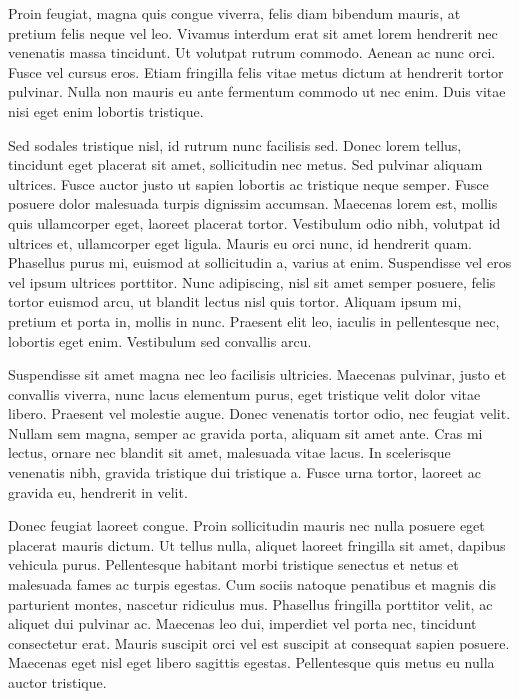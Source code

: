 \documentclass[draft=false]{book}
\begin{document}
Proin feugiat, magna quis congue viverra, felis diam bibendum mauris, at pretium felis neque vel leo. Vivamus interdum erat sit amet lorem hendrerit nec venenatis massa tincidunt. Ut volutpat rutrum commodo. Aenean ac nunc orci. Fusce vel cursus eros. Etiam fringilla felis vitae metus dictum at hendrerit tortor pulvinar. Nulla non mauris eu ante fermentum commodo ut nec enim. Duis vitae nisi eget enim lobortis tristique. 

Sed sodales tristique nisl, id rutrum nunc facilisis sed. Donec lorem tellus, tincidunt eget placerat sit amet, sollicitudin nec metus. Sed pulvinar aliquam ultrices. Fusce auctor justo ut sapien lobortis ac tristique neque semper. Fusce posuere dolor malesuada turpis dignissim accumsan. Maecenas lorem est, mollis quis ullamcorper eget, laoreet placerat tortor. Vestibulum odio nibh, volutpat id ultrices et, ullamcorper eget ligula. Mauris eu orci nunc, id hendrerit quam. Phasellus purus mi, euismod at sollicitudin a, varius at enim. Suspendisse vel eros vel ipsum ultrices porttitor. Nunc adipiscing, nisl sit amet semper posuere, felis tortor euismod arcu, ut blandit lectus nisl quis tortor. Aliquam ipsum mi, pretium et porta in, mollis in nunc. Praesent elit leo, iaculis in pellentesque nec, lobortis eget enim. Vestibulum sed convallis arcu.

Suspendisse sit amet magna nec leo facilisis ultricies. Maecenas pulvinar, justo et convallis viverra, nunc lacus elementum purus, eget tristique velit dolor vitae libero. Praesent vel molestie augue. Donec venenatis tortor odio, nec feugiat velit. Nullam sem magna, semper ac gravida porta, aliquam sit amet ante. Cras mi lectus, ornare nec blandit sit amet, malesuada vitae lacus. In scelerisque venenatis nibh, gravida tristique dui tristique a. Fusce urna tortor, laoreet ac gravida eu, hendrerit in velit.

Donec feugiat laoreet congue. Proin sollicitudin mauris nec nulla posuere eget placerat mauris dictum. Ut tellus nulla, aliquet laoreet fringilla sit amet, dapibus vehicula purus. Pellentesque habitant morbi tristique senectus et netus et malesuada fames ac turpis egestas. Cum sociis natoque penatibus et magnis dis parturient montes, nascetur ridiculus mus. Phasellus fringilla porttitor velit, ac aliquet dui pulvinar ac. Maecenas leo dui, imperdiet vel porta nec, tincidunt consectetur erat. Mauris suscipit orci vel est suscipit at consequat sapien posuere. Maecenas eget nisl eget libero sagittis egestas. Pellentesque quis metus eu nulla auctor tristique.
\end{document}
